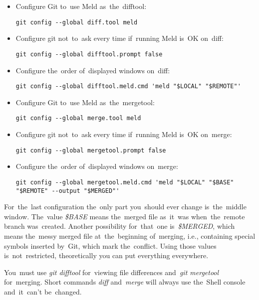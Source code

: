 \begin{itemize}
    \item Configure Git to~use Meld as~the~difftool:
        \begin{lstlisting}[frame=no, gobble=12]
            git config --global diff.tool meld
        \end{lstlisting}
    \item Configure git not~to~ask every time if~running Meld is~OK on~diff:
        \begin{lstlisting}[frame=no, gobble=12]
            git config --global difftool.prompt false
        \end{lstlisting}
    \item Configure the~order of~displayed windows on~diff:
        \begin{lstlisting}[frame=no, gobble=12]
            git config --global difftool.meld.cmd 'meld "$LOCAL" "$REMOTE"'
        \end{lstlisting}
    \item Configure Git to~use Meld as~the~mergetool:
        \begin{lstlisting}[frame=no, gobble=12]
            git config --global merge.tool meld
        \end{lstlisting}
    \item Configure git not~to~ask every time if~running Meld is~OK on~merge:
        \begin{lstlisting}[frame=no, gobble=12]
            git config --global mergetool.prompt false
        \end{lstlisting}
    \item Configure the~order of~displayed windows on~merge:
        \begin{lstlisting}[frame=no, gobble=12]
            git config --global mergetool.meld.cmd 'meld "$LOCAL" "$BASE" "$REMOTE" --output "$MERGED"'
        \end{lstlisting}
\end{itemize}

\note For~the~last configuration the~only part you~should ever change is~the~middle window. The~value \textit{\$BASE} means the~merged file as~it~was when~the~remote branch was~created. Another possibility for~that~one is~\textit{\$MERGED}, which means the~messy merged file at~the~beginning of~merging, i.e., containing special symbols inserted by~Git, which mark the~conflict. Using those values is~not~restricted, theoretically you can put everything everywhere.
\newpage

You~must use \textit{git difftool} for~viewing file differences and~\textit{git mergetool} for~merging. Short commands \textit{diff} and~\textit{merge} will always use the~Shell console and~it~can't be~changed.

